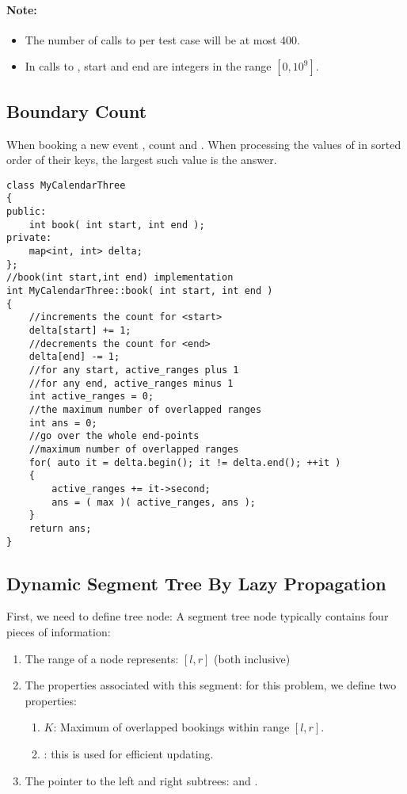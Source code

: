 \paragraph{Note:}

\begin{itemize}
\item The number of calls to  per test case will be at most 400.
\item In calls to , start and end are integers in the range $[0, 10^9]$.

\end{itemize}

\subsection{Boundary Count}
When booking a new event \fcj{[start, end)}, count  and . When processing the values of  in sorted order of their keys, the largest such value is the answer.

\setcounter{lstlisting}{0}
\begin{lstlisting}[style=customc, caption={Boundary Count}]
class MyCalendarThree
{
public:
    int book( int start, int end );
private:
    map<int, int> delta;
};
//book(int start,int end) implementation
int MyCalendarThree::book( int start, int end )
{
    //increments the count for <start>
    delta[start] += 1;
    //decrements the count for <end>
    delta[end] -= 1;
    //for any start, active_ranges plus 1
    //for any end, active_ranges minus 1
    int active_ranges = 0;
    //the maximum number of overlapped ranges
    int ans = 0;
    //go over the whole end-points
    //maximum number of overlapped ranges
    for( auto it = delta.begin(); it != delta.end(); ++it )
    {
        active_ranges += it->second;
        ans = ( max )( active_ranges, ans );
    }
    return ans;
}
\end{lstlisting}

\subsection{Dynamic Segment Tree By Lazy Propagation}
First, we need to define tree node: A segment tree node typically contains four pieces of information:

\begin{enumerate}
\item The range of a node represents: $[l, r]$ (both inclusive)

\item The properties associated with this segment: for this problem, we define two properties:

\begin{enumerate}
\item $K$: Maximum of overlapped bookings within range $[l, r]$.
\item {}: this is used for efficient updating.
\end{enumerate}
\item The pointer to the left and right subtrees:  and .
\end{enumerate}

